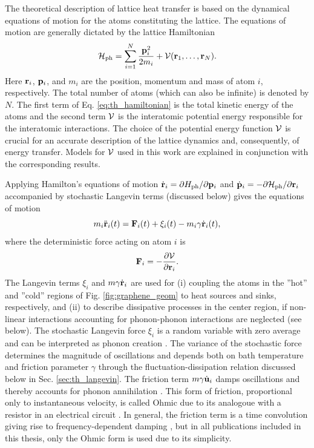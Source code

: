 The theoretical description of lattice heat transfer is based on the dynamical equations of motion for the atoms constituting the lattice. The equations of motion are generally dictated by the lattice Hamiltonian \cite{ziman}
\begin{equation}
 \mathcal{H}_{\textrm{ph}} = \sum_{i=1}^N \frac{\mathbf{p}_i^2}{2m_i} + \mathcal{V}(\mathbf{r}_1,\dots,\mathbf{r}_N). \label{eq:th_hamiltonian}
\end{equation}
Here $\mathbf{r}_i$, $\mathbf{p}_i$, and $m_i$ are the position, momentum and mass of atom $i$, respectively. The total number of atoms (which can also be infinite) is denoted by $N$. The first term of Eq. \eqref{eq:th_hamiltonian} is the total kinetic energy of the atoms and the second term $\mathcal{V}$ is the interatomic potential energy responsible for the interatomic interactions. The choice of the potential energy function $\mathcal{V}$ is crucial for an accurate description of the lattice dynamics and, consequently, of energy transfer. Models for $\mathcal{V}$ used in this work are explained in conjunction with the corresponding results.

Applying Hamilton's equations of motion $\dot{\mathbf{r}}_i=\partial H_{\textrm{ph}}/\partial \mathbf{p}_i$ and $\dot{\mathbf{p}}_i=-\partial \mathcal{H}_{\textrm{ph}}/\partial \mathbf{r}_i$ \cite{fetter} accompanied by stochastic Langevin terms (discussed below) gives the equations of motion
\begin{equation}
 m_i \ddot{\mathbf{r}}_i(t) = \mathbf{F}_i(t) + \xi_i(t) - m_i \gamma \dot{\mathbf{r}}_i(t), \label{eq:th_eom}
\end{equation}
where the deterministic force acting on atom $i$ is
\begin{equation}
 \mathbf{F}_i = - \frac{\partial \mathcal{V}}{\partial \mathbf{r}_i}. \label{eq:th_force}
\end{equation}
The Langevin terms $\xi_i$ and $m\gamma \dot{\mathbf{r}}_i$ are used for (i) coupling the atoms in the ''hot'' and ''cold'' regions of Fig. \ref{fig:graphene_geom} to heat sources and sinks, respectively,  and (ii) to describe dissipative processes in the center region, if non-linear interactions accounting for phonon-phonon interactions are neglected (see below). The stochastic Langevin force $\xi_i$ is a random variable with zero average and can be interpreted as phonon creation \cite{}. The variance of the stochastic force determines the magnitude of oscillations and depends both on bath temperature and friction parameter $\gamma$ through the fluctuation-dissipation relation discussed below in Sec. \ref{sec:th_langevin}. The friction term $m\gamma\dot{\mathbf{u}}_i$ damps oscillations and thereby accounts for phonon annihilation \cite{}. This form of friction, proportional only to instantaneous velocity, is called Ohmic due to its analogoue with a resistor in an electrical circuit \cite{weiss}. In general, the friction term is a time convolution giving rise to frequency-dependent damping \cite{weiss}, but in all publications included in this thesis, only the Ohmic form is used due to its simplicity.

